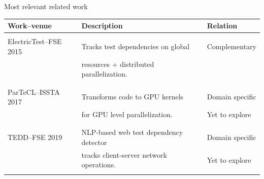 \documentclass{beamer}
\begin{document}
\begin{frame}{Most relevant related work}
	\begin{center}
		\fontsize{7.5}{7.5}
		{	
			\selectfont
			\setlength{\tabcolsep}{0.9mm}
			\centering
			\begin{tabular}{l|l|l}
				\hline
				{\textbf{Work--venue}} & {\textbf{Description}} & {\textbf{Relation}}\\
				\hline
				{} & {} & {} \\
				{{\rsm ElectricTest}--FSE 2015} & {Tracks {\rsm test dependencies} on global} & {Complementary}\\
				{} & {resources + {\rsm distributed parallelization}.} & {} \\
				{} & {} & {} \\
				\hline\pause
				{} & {} & {} \\
				{{\rsm ParTeCL}--ISSTA 2017} & {Transforms code to GPU kernels} & {Domain specific}\\
				{} & {for {\rsm GPU level parallelization}.} & {Yet to explore} \\
				{} & {} & {} \\
				\hline\pause
				{} & {} & {} \\
				{{\rsm TEDD}--FSE 2019} & {NLP-based {\rsm web test dependency} detector} & {Domain specific}\\
				{} & {tracks client-server {\rsm network operations}.} & {Yet to explore} \\
				{} & {} & {} \\
				\hline
			\end{tabular}
		}	
	\end{center}
	\centering
\end{frame}
\end{document}

